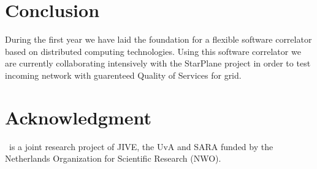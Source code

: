 \section{Conclusion}
During the first year we have laid the foundation for a
flexible software correlator based on distributed
computing technologies. Using this software correlator we
are currently collaborating intensively with the StarPlane
project in order to test incoming network with guarenteed 
Quality of Services for grid. 

\section{Acknowledgment}
\scarie\ is a joint research project of JIVE, the UvA and SARA funded by the Netherlands Organization for Scientific Research (NWO). 


